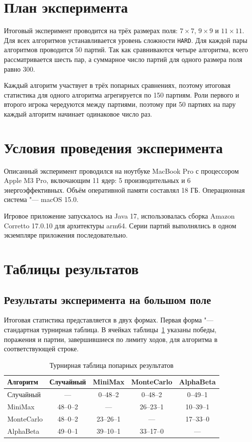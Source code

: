 \documentclass[a4paper,12pt]{diplom}
\begin{document}
\section{План эксперимента}

Итоговый эксперимент проводится на трёх размерах поля: $7 \times 7$, $9 \times 9$ и $11 \times 11$. Для всех алгоритмов устанавливается уровень сложности \texttt{HARD}. Для каждой пары алгоритмов проводится 50 партий. Так как сравниваются четыре алгоритма, всего рассматривается шесть пар, а суммарное число партий для одного размера поля равно 300.

Каждый алгоритм участвует в трёх попарных сравнениях, поэтому итоговая статистика для одного алгоритма агрегируется по 150 партиям. Роли первого и второго игрока чередуются между партиями, поэтому при 50 партиях на пару каждый алгоритм начинает одинаковое число раз.

\section{Условия проведения эксперимента}

Описанный эксперимент проводился на ноутбуке MacBook Pro с процессором Apple M3 Pro, включающим 11 ядер: 5 производительных и 6 энергоэффективных. Объём оперативной памяти составлял 18 ГБ. Операционная система "--- macOS 15.0.

Игровое приложение запускалось на Java 17, использовалась сборка Amazon Corretto 17.0.10 для архитектуры arm64. Серии партий выполнялись в одном экземпляре приложения последовательно.

\section{Таблицы результатов}

\subsection{Результаты эксперимента на большом поле}

Итоговая статистика представляется в двух формах. Первая форма "--- стандартная турнирная таблица. В ячейках таблицы~\ref{tab:tournament} указаны победы, поражения и партии, завершившиеся по лимиту ходов, для алгоритма в соответствующей строке.

\begin{table}[h]
\centering
\caption{Турнирная таблица попарных результатов}
\label{tab:tournament}
\begin{tabular}{lcccc}
\toprule
Алгоритм & Случайный & MiniMax & MonteCarlo & AlphaBeta \\
\midrule
Случайный  & --- & 0--48--2 & 0--48--2 & 0--49--1 \\
MiniMax    & 48--0--2 & --- & 26--23--1 & 10--39--1 \\
MonteCarlo & 48--0--2 & 23--26--1 & --- & 17--33--0 \\
AlphaBeta  & 49--0--1 & 39--10--1 & 33--17--0 & --- \\
\bottomrule
\end{tabular}
\end{table}
\end{document}
